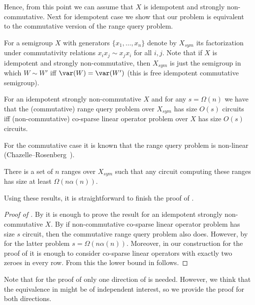 \documentclass{toc}
\begin{document}
Hence, from this point we can assume that $X$ is idempotent and strongly
non-commutative. Next for idempotent case we show that our problem is equivalent
to the commutative version of the range query problem.

For a semigroup $X$ with generators $\{x_1,\ldots, x_n\}$ denote by $X_{sym}$
its factorization under commutativity relations
$x_i x_j \sim x_j x_i$ for all $i,j$. Note that if $X$ is idempotent and
strongly non-commutative, then $X_{sym}$ is just the semigroup in which
$W \sim W'$ iff $\var(W)=\var(W')$ (this is free idempotent commutative
semigroup).

\begin{theorem}\label{thm:equivalence}
For an idempotent strongly non-commutative $X$ and for any $s=\Omega(n)$ we have
that the (commutative)
%
%
range query problem
over $X_{sym}$ has size $O(s)$ circuits
iff (non-commutative)
%
%
co-sparse
linear operator problem over $X$ has size $O(s)$
circuits.
\end{theorem}

%
%
%
%
%
%
%
For the commutative case it is known that
%
%
the range query
problem is non-linear
(Chazelle--Rosenberg~\cite{DBLP:journals/ijcga/ChazelleR91}).  %
\begin{theorem}\label{thm:chazelle}
	There is a set of $n$ ranges over $X_{sym}$ such that any circuit
	computing these ranges has size at least $\Omega(n \alpha(n))$.
\end{theorem}

Using these results, it is straightforward to finish the proof of
.

\begin{proof}[Proof of {}]

By  it is enough to prove the result for an idempotent strongly non-commutative $X$.
By  if non-commutative
%
%
co-sparse
linear
operator problem has size $s$ circuit, then the commutative
%
%
range query
problem also does. However, by  for the latter problem $s=\Omega(n \alpha(n))$.
Moreover, in our construction for the proof of  it
is enough to consider
%
%
co-sparse
linear operators with exactly two zeroes in every
row. From this the lower bound in  follows.
\end{proof}

Note that for the proof of  only one direction of
 is needed. However, we think that the equivalence
in  might be of independent interest, so we provide
the proof for both directions.
\end{document}
